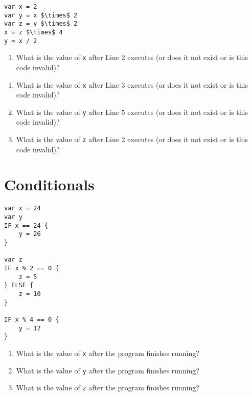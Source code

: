 \documentclass{article}
\begin{document}
\begin{Exercise}

\begin{lstlisting}[caption={Pseudocode.}, label={code:exercise_var_3},mathescape]
var x = 2
var y = x $\times$ 2
var z = y $\times$ 2
x = z $\times$ 4
y = x / 2
\end{lstlisting}

\begin{enumerate}
\item What is the value of \lstinline{x} after Line 2 executes (or does it not exist or is this code invalid)?
\end{enumerate}

\begin{enumerate}
\item What is the value of \lstinline{x} after Line 3 executes (or does it not exist or is this code invalid)?
\item What is the value of \lstinline{y} after Line 5 executes (or does it not exist or is this code invalid)?
\item What is the value of \lstinline{z} after Line 2 executes (or does it not exist or is this code invalid)?
\end{enumerate}

\end{Exercise}

\section{Conditionals}
\setcounter{Exercise}{0}

\begin{Exercise}
\begin{lstlisting}[caption={Pseudocode.}, label={code:exercise_conditionals_1},mathescape]
var x = 24
var y
IF x == 24 {
    y = 26
}

var z
IF x % 2 == 0 {
    z = 5
} ELSE {
    z = 10
}

IF x % 4 == 0 {
    y = 12
}
\end{lstlisting}

\begin{enumerate}
\item What is the value of \lstinline{x} after the program finishes running?
\item What is the value of \lstinline{y} after the program finishes running?
\item What is the value of \lstinline{z} after the program finishes running?
\end{enumerate}
\end{Exercise}
\end{document}
